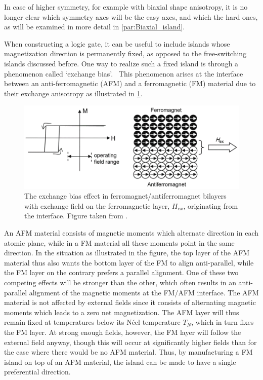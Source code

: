\documentclass[12pt,a4paper]{article}
\begin{document}
In case of higher symmetry, for example with biaxial shape anisotropy, it is no longer clear which symmetry axes will be the easy axes, and which the hard ones, as will be examined in more detail in \cref{par:Biaxial_island}.  \par
When constructing a logic gate, it can be useful to include islands whose magnetization direction is permanently fixed, as opposed to the free-switching islands discussed before. One way to realize such a fixed island is through a phenomenon called `exchange bias'.~\cite{ExchangeBias_Mechanisms,ExchangeBias_nanostructures,ExchangeBias,syllabus_PoAEaPD} This phenomenon arises at the interface between an anti-ferromagnetic (AFM) and a ferromagnetic (FM) material due to their exchange anisotropy as illustrated in \cref{fig:Intro_ExchangeBias}.
\begin{figure}[t]
    \centering
    \includegraphics[width=0.8\columnwidth]{Figures/Introduction/Syallabus_PoAEaPD - Figure 2.7.png}
    \caption{The exchange bias effect in ferromagnet/antiferromagnet bilayers with exchange field on the ferromagnetic layer, $H_{ex}$, originating from the interface. Figure taken from \cite{syllabus_PoAEaPD}.}
    \label{fig:Intro_ExchangeBias}
\end{figure}
An AFM material consists of magnetic moments which alternate direction in each atomic plane, while in a FM material all these moments point in the same direction. In the situation as illustrated in the figure, the top layer of the AFM material thus also wants the bottom layer of the FM to align anti-parallel, while the FM layer on the contrary prefers a parallel alignment. One of these two competing effects will be stronger than the other, which often results in an anti-parallel alignment of the magnetic moments at the FM/AFM interface. The AFM material is not affected by external fields since it consists of alternating magnetic moments which leads to a zero net magnetization. The AFM layer will thus remain fixed at temperatures below its N\'{e}el temperature $T_N$, which in turn fixes the FM layer. At strong enough fields, however, the FM layer will follow the external field anyway, though this will occur at significantly higher fields than for the case where there would be no AFM material. Thus, by manufacturing a FM island on top of an AFM material, the island can be made to have a single preferential direction. \par
\end{document}
